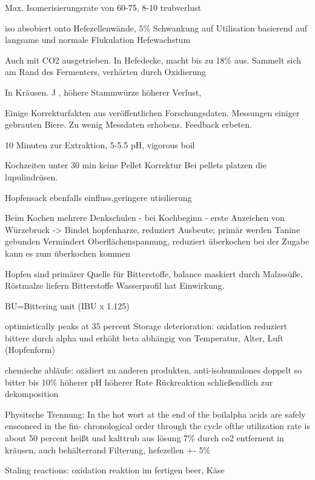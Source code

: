\documentclass[a4paper,parskip=half]{scrartcl}
\begin{document}
\parencite[126]{Garetz1994} 
Max. Isomerisierungsrate von 60-75, 8-10 trubverlust

iso absobiert onto Hefezellenwände, 5\% Schwankung auf
Utilisation basierend auf langsame und normale Flukulation
Hefewachstum

Auch mit CO2 ausgetrieben. In Hefedecke, macht bis zu 18\%
aus. Sammelt sich am Rand des Fermenters, verhärten durch
Oxidierung

\parencite[133]{Garetz1994} 
In Kräusen. J , höhere Stammwürze höherer Verlust, 

\parencite[128]{Garetz1994} 
Einige Korrekturfakten aus veröffentlichen Forschungsdaten. 
Messungen einiger gebrauten Biere.
Zu wenig Messdaten erhobens. Feedback erbeten.

10 Minuten zur Extraktion, 5-5.5 pH, vigorous boil

\parencite[130]{Garetz1994} 
Kochzeiten unter 30 min keine Pellet Korrektur
Bei pellets platzen die lupulindrüsen. 

Hopfensack ebenfalls einfluss,geringere utisilierung

\parencite[153]{Garetz1994} 
Beim Kochen mehrere Denkschulen
- bei Kochbeginn
- erste Anzeichen von Würzebruck
-> Bindet hopfenharze, reduziert Ausbeute; primär werden
Tanine gebunden
Vermindert Oberflächenspannung, reduziert überkochen
bei der Zugabe kann es zum überkochen kommen

\parencite[158\psq]{Garetz1994} 
Hopfen sind primärer Quelle für Bitterstoffe, balance
maskiert durch Malzssüße, 
Röstmalze liefern Bitterstoffe
Wasserprofil hat Einwirkung.

BU=Bittering unit (IBU x 1.125)
\parencite[215]{Noonan1996}


\parencite[57]{Hall1997}
optimistically peaks at 35 percent
Storage deterioration: oxidation reduziert bittere durch alpha und erhöht beta
abhängig von Temperatur, Alter, Luft (Hopfenform)

chemische abläufe: oxidiert zu anderen produkten, 
anti-isohumulones doppelt so bitter bis 10\%
höherer pH höherer Rate
Rückreaktion schließendlich zur dekomposition

Physitsche Trennung: In the hot wort at the end of the boilalpha acids are safely ensconced in the fin-
chronological order through the cycle ofthe utilization rate is about 50 percent
heißt und kalttrub aus lösung 7\%
durch co2 entfernent in kräusen, auch behälterrand
Filterung, hefezellen +- 5\%

Staling reactions: oxidation reaktion im fertigen beer, Käse
\end{document}
